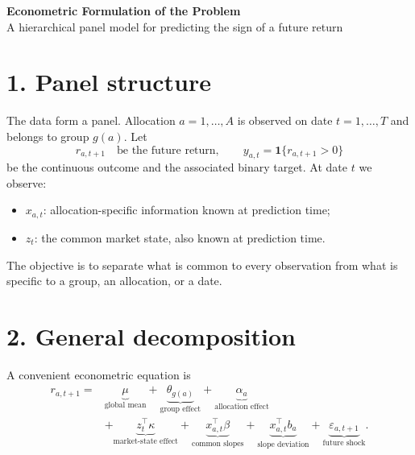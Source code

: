 \documentclass[10pt,a4paper]{article}
\begin{document}
\begin{center}
  {\Large\bfseries\color{qrtblue} Econometric Formulation of the Problem}\\[0.35em]
  {\small A hierarchical panel model for predicting the sign of a future return}
\end{center}

\section*{1. Panel structure}

The data form a panel. Allocation $a=1,\ldots,A$ is observed on date
$t=1,\ldots,T$ and belongs to group $g(a)$. Let
\[
  r_{a,t+1} \quad \text{be the future return},
  \qquad
  y_{a,t}=\mathbf 1\{r_{a,t+1}>0\}
\]
be the continuous outcome and the associated binary target. At date $t$ we
observe:
\begin{itemize}
  \item $x_{a,t}$: allocation-specific information known at prediction time;
  \item $z_t$: the common market state, also known at prediction time.
\end{itemize}

The objective is to separate what is common to every observation from what is
specific to a group, an allocation, or a date.

\section*{2. General decomposition}

A convenient econometric equation is
\begin{equation}
\boxed{
\begin{aligned}
 r_{a,t+1}
 ={}& \underbrace{\mu}_{\text{global mean}}
 + \underbrace{\theta_{g(a)}}_{\text{group effect}}
 + \underbrace{\alpha_a}_{\text{allocation effect}} \\
 &+ \underbrace{z_t^{\top}\kappa}_{\text{market-state effect}}
 + \underbrace{x_{a,t}^{\top}\beta}_{\text{common slopes}}
 + \underbrace{x_{a,t}^{\top}b_a}_{\text{slope deviation}}
 + \underbrace{\varepsilon_{a,t+1}}_{\text{future shock}}.
\end{aligned}
}
\label{eq:panel}
\end{equation}
\end{document}
